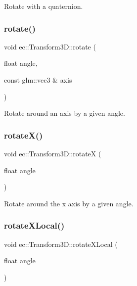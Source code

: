 Rotate with a quaternion. \mbox{\label{classec_1_1_transform3_d_ac9787bc7e772a5ef4f9a7ed36be1ae10}} 
\subsubsection{\texorpdfstring{rotate()}{rotate()}\hspace{0.1cm}{\footnotesize\ttfamily [2/2]}}
{\footnotesize\ttfamily void ec\+::\+Transform3\+D\+::rotate (\begin{DoxyParamCaption}\item[{float}]{angle,  }\item[{const glm\+::vec3 \&}]{axis }\end{DoxyParamCaption})}

Rotate around an axis by a given angle. \mbox{\label{classec_1_1_transform3_d_a620c1729b027b54d0cabe03a8cdc9253}} 
\subsubsection{\texorpdfstring{rotate\+X()}{rotateX()}}
{\footnotesize\ttfamily void ec\+::\+Transform3\+D\+::rotateX (\begin{DoxyParamCaption}\item[{float}]{angle }\end{DoxyParamCaption})}

Rotate around the x axis by a given angle. \mbox{\label{classec_1_1_transform3_d_a7124a324cea1d06b438248003d332ee2}} 
\subsubsection{\texorpdfstring{rotate\+X\+Local()}{rotateXLocal()}}
{\footnotesize\ttfamily void ec\+::\+Transform3\+D\+::rotate\+X\+Local (\begin{DoxyParamCaption}\item[{float}]{angle }\end{DoxyParamCaption})}

